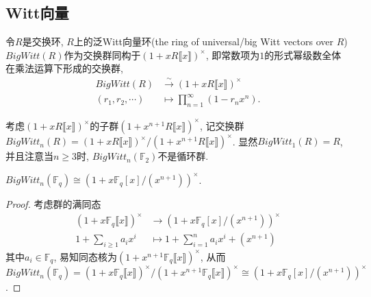 \subsection{Witt向量}
令$R$是交换环, $R$上的泛Witt向量环(the ring of universal/big Witt vectors over $R$)$BigWitt(R)$作为交换群同构于$(1+xR\llbracket x\rrbracket )^{\times}$, 即常数项为$1$的形式幂级数全体在乘法运算下形成的交换群, 
\begin{align*}
BigWitt(R) &\overset{\sim}\longrightarrow (1+xR\llbracket x\rrbracket )^{\times}\\
(r_1, r_2, \cdots) & \mapsto \prod_{n=1}^{\infty}(1-r_n x^n). 
\end{align*}



考虑$(1+xR\llbracket x\rrbracket )^{\times}$的子群$(1+x^{n+1}R\llbracket x\rrbracket )^{\times}$, 记交换群%
$BigWitt_n(R)=(1+xR\llbracket x\rrbracket )^{\times}/(1+x^{n+1}R\llbracket x\rrbracket )^{\times}$. 显然$BigWitt_1(R)=R$, 并且注意当$n\geq 3$时, $BigWitt_n(\mathbb{F}_2)$不是循环群. 

% 
% 							
% 									
%
{\color{blue}\begin{lemma}
	 $BigWitt_n(\mathbb{F}_q)\cong (1+x\mathbb{F}_q[x]/(x^{n+1}))^{\times}$. 
\end{lemma}}
\begin{proof}
	考虑群的满同态
	\begin{align*}
	(1+x \mathbb{F}_q\llbracket x\rrbracket )^{\times} &\longrightarrow (1+x \mathbb{F}_q[x]/(x^{n+1}))^{\times}\\
	1+\sum_{i\geq 1}a_i x^i &\mapsto 1+\sum_{i = 1}^{n}a_i x^i +(x^{n+1})
	\end{align*}
	其中$a_i\in \mathbb{F}_q$, 易知同态核为$(1+x^{n+1} \mathbb{F}_q\llbracket x\rrbracket )^{\times}$, 
	从而$BigWitt_n(\mathbb{F}_q)=(1+x \mathbb{F}_q\llbracket x\rrbracket )^{\times}/(1+x^{n+1} \mathbb{F}_q\llbracket x\rrbracket )^{\times} \cong (1+x\mathbb{F}_q[x]/(x^{n+1}))^{\times}$. 
\end{proof}


